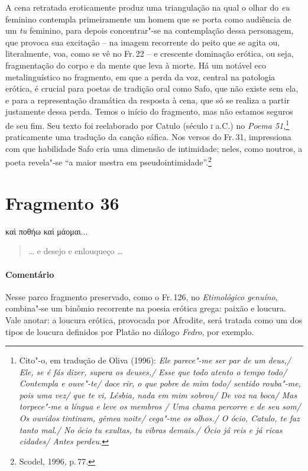 {A cena retratada eroticamente produz uma triangulação na qual o olhar do \textit{eu}
feminino contempla primeiramente um homem que se porta como audiência de um
\textit{tu} feminino, para depois concentrar"-se na contemplação dessa
personagem, que provoca sua excitação -- na imagem recorrente do peito que se agita ou,
literalmente, voa, como se vê no Fr.\,22 -- e crescente dominação erótica, ou
seja, fragmentação do corpo e da mente que leva à morte. Há um notável eco
metalinguístico no fragmento, em que a perda da voz, central na patologia
erótica, é crucial para poetas de tradição oral como Safo, que não existe sem
ela, e para a representação dramática da resposta à cena, que só se realiza a
partir justamente dessa perda. Temos o início do fragmento, mas não estamos
seguros de seu fim. Seu texto foi reelaborado por Catulo (século \textsc{i}
a.C.) no \textit{Poema 51},\footnote{ Cito"-o, em tradução de Oliva (1996):
\textit{Ele parece"-me ser par de um deus,/ Ele, se é fás dizer, supera os
deuses,/ Esse que todo atento o tempo todo/ Contempla e ouve"-te/ doce rir, o
que pobre de mim todo/ sentido rouba"-me, pois uma vez/ que te vi, Lésbia,
nada em mim sobrou/ De voz na boca/ Mas torpece"-me a língua e leve os membros
/ Uma chama percorre e de seu som/ Os ouvidos tintinam, gêmea noite/ cega"-me
os olhos./ O ócio, Catulo, te faz tanto mal./ No ócio tu exultas, tu vibras
demais./ Ócio já reis e já ricas cidades/ Antes perdeu.}} praticamente uma
tradução da canção sáfica.
Nos versos do Fr.\,31, impressiona com que habilidade Safo cria uma dimensão de intimidade; neles, como noutros, a poeta revela"-se ``a maior mestra em pseudointimidade''.\footnote{Scodel, 1996, p.\,77.}}



\pagebreak
\section{Fragmento 36}

\begin{gkverse}
καὶ ποθήω καὶ μάομαι...
\end{gkverse}

\begin{verse}
\ldots{} e desejo e enlouqueço \ldots{}
\end{verse}

\medskip

{\paragraph{Comentário} Nesse parco fragmento preservado, como o Fr.\,126, no \textit{Etimológico genuíno}, combina"-se um binômio recorrente na poesia erótica grega:
paixão e loucura. Vale anotar: a loucura erótica, provocada por Afrodite, será
tratada como um dos tipos de loucura definidos por Platão
no diálogo \textit{Fedro}, por exemplo.}


